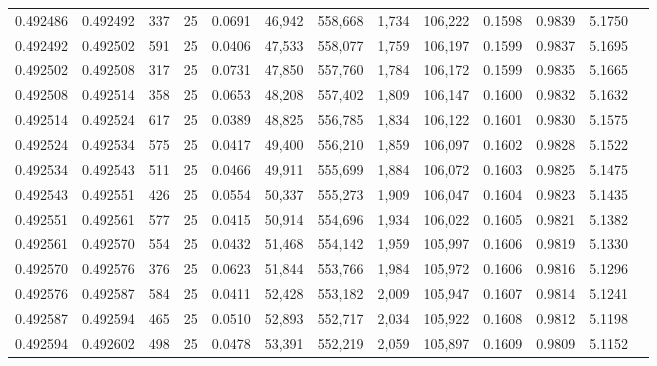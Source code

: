 \begin{tabular}{rrrrrrrrrrrrr}
0.492486 & 0.492492 &   337 &  25 &                                     0.0691 &  46,942 & 558,668 &   1,734 & 106,222 & 0.1598 & 0.9839 & 5.1750 \\
0.492492 & 0.492502 &   591 &  25 &                                     0.0406 &  47,533 & 558,077 &   1,759 & 106,197 & 0.1599 & 0.9837 & 5.1695 \\
0.492502 & 0.492508 &   317 &  25 &                                     0.0731 &  47,850 & 557,760 &   1,784 & 106,172 & 0.1599 & 0.9835 & 5.1665 \\
0.492508 & 0.492514 &   358 &  25 &                                     0.0653 &  48,208 & 557,402 &   1,809 & 106,147 & 0.1600 & 0.9832 & 5.1632 \\
0.492514 & 0.492524 &   617 &  25 &                                     0.0389 &  48,825 & 556,785 &   1,834 & 106,122 & 0.1601 & 0.9830 & 5.1575 \\
0.492524 & 0.492534 &   575 &  25 &                                     0.0417 &  49,400 & 556,210 &   1,859 & 106,097 & 0.1602 & 0.9828 & 5.1522 \\
0.492534 & 0.492543 &   511 &  25 &                                     0.0466 &  49,911 & 555,699 &   1,884 & 106,072 & 0.1603 & 0.9825 & 5.1475 \\
0.492543 & 0.492551 &   426 &  25 &                                     0.0554 &  50,337 & 555,273 &   1,909 & 106,047 & 0.1604 & 0.9823 & 5.1435 \\
0.492551 & 0.492561 &   577 &  25 &                                     0.0415 &  50,914 & 554,696 &   1,934 & 106,022 & 0.1605 & 0.9821 & 5.1382 \\
0.492561 & 0.492570 &   554 &  25 &                                     0.0432 &  51,468 & 554,142 &   1,959 & 105,997 & 0.1606 & 0.9819 & 5.1330 \\
0.492570 & 0.492576 &   376 &  25 &                                     0.0623 &  51,844 & 553,766 &   1,984 & 105,972 & 0.1606 & 0.9816 & 5.1296 \\
0.492576 & 0.492587 &   584 &  25 &                                     0.0411 &  52,428 & 553,182 &   2,009 & 105,947 & 0.1607 & 0.9814 & 5.1241 \\
0.492587 & 0.492594 &   465 &  25 &                                     0.0510 &  52,893 & 552,717 &   2,034 & 105,922 & 0.1608 & 0.9812 & 5.1198 \\
0.492594 & 0.492602 &   498 &  25 &                                     0.0478 &  53,391 & 552,219 &   2,059 & 105,897 & 0.1609 & 0.9809 & 5.1152 \\

\end{tabular}

